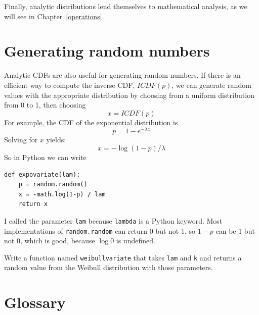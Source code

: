 \documentclass[12pt]{book}
\begin{document}
Finally, analytic distributions lend themselves to mathematical
analysis, as we will see in Chapter~\ref{operations}.


\section{Generating random numbers}

Analytic CDFs are also useful for generating random numbers.
If there is an efficient way to compute the inverse CDF, $ICDF(p)$,
we can generate random values with the appropriate distribution
by choosing from a uniform distribution from 0 to 1, then choosing
%
\[ x = ICDF(p)\]
%
For example, the CDF of the exponential distribution is
%
\[ p = 1 - e^{-\lambda x} \]
%
Solving for $x$ yields:
%
\[ x = -\log (1 - p) / \lambda \]
%
So in Python we can write
%
\begin{verbatim}
def expovariate(lam):
    p = random.random()
    x = -math.log(1-p) / lam
    return x
\end{verbatim}

I called the parameter \verb"lam" because \verb"lambda" is a Python
keyword.  Most implementations of {\tt random.random} can return 0 but
not 1, so $1 - p$ can be 1 but not 0, which is good, because $\log 0$ is
undefined.

\begin{exercise}
Write a function named \verb"weibullvariate" that takes
\verb"lam" and \verb"k" and returns a random value from the Weibull
distribution with those parameters.

\end{exercise}


\section{Glossary}
\end{document}
